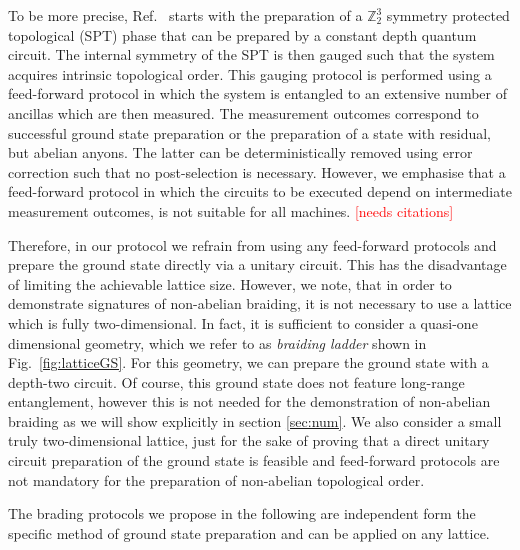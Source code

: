\documentclass[two column]{article}
\newcommand{\caro}[1]{\textcolor{red}{[#1]}}
\begin{document}
To be more precise, Ref.~\cite{iqbal2023creation} starts with the preparation of a $\mathbb Z_2^3$ symmetry protected topological (SPT) phase that can be prepared by a constant depth quantum circuit. The internal symmetry of the SPT is then gauged such that the system acquires intrinsic topological order. This gauging protocol is performed using a feed-forward protocol in which the system is entangled to an extensive number of ancillas which are then measured. The measurement outcomes correspond to successful ground state preparation or the preparation of a state with residual, but abelian anyons. The latter can be deterministically removed using error correction such that no post-selection is necessary. However, we emphasise that a feed-forward protocol in which the circuits to be executed depend on intermediate measurement outcomes, is not suitable for all machines. \caro{needs citations} 

Therefore, in our protocol we refrain from using any feed-forward protocols and prepare the ground state directly via a unitary circuit. This has the disadvantage of limiting the achievable lattice size. However, we note, that in order to demonstrate signatures of non-abelian braiding, it is not necessary to use a lattice which is fully two-dimensional. In fact, it is sufficient to consider a quasi-one dimensional geometry, which we refer to as \emph{braiding ladder} shown in Fig.~\ref{fig:latticeGS}. For this geometry, we can prepare the ground state with a depth-two circuit. Of course, this ground state does not feature long-range entanglement, however this is not needed for the demonstration of non-abelian braiding as we will show explicitly in section \ref{sec:num}. We also consider a small truly two-dimensional lattice, just for the sake of proving that a direct unitary circuit preparation of the ground state is feasible and feed-forward protocols are not mandatory for the preparation of non-abelian topological order.

The brading protocols we propose in the following are independent form the specific method of ground state preparation and can be applied on any lattice.
\end{document}
